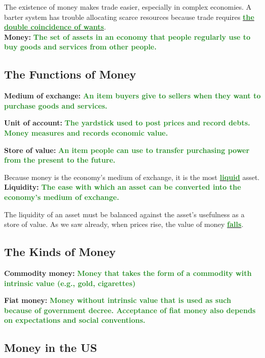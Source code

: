 \documentclass[11pt]{article}\usepackage[]{graphicx}\usepackage[]{color}
\theoremstyle{definition}
\newcommand{\ddp}[1]{{\textbf{\textcolor{ForestGreen}{#1}}}}
\newcommand{\dd}[1]{{\underline{\textbf{\textcolor{ForestGreen}{#1}}}}}
\newcommand{\defn}[1]{\textbf{#1}}
\begin{document}
The existence of money makes trade easier, especially in complex economies. A barter system has trouble allocating scarce resources because trade requires \dd{the double coincidence of wants}.
\\

\defn{Money:} \ddp{The set of assets in an economy that people regularly use to buy goods and services from other people.}

\subsection{The Functions of Money}

\defn{Medium of exchange:} \ddp{An item buyers give to sellers when they want to purchase goods and services.\\}

\defn{Unit of account:} \ddp{The yardstick used to post prices and record debts. Money measures and records economic value.\\}

\defn{Store of value:} \ddp{An item people can use to transfer purchasing power from the present to the future.\\}

Because money is the economy's medium of exchange, it is the most \dd{liquid} asset.
\\

\defn{Liquidity:} \ddp{The ease with which an asset can be converted into the economy's medium of exchange.\\}

The liquidity of an asset must be balanced against the asset's usefulness as a store of value. As we saw already, when prices rise, the value of money \dd{falls}. 

\subsection{The Kinds of Money}

\defn{Commodity money:} \ddp{Money that takes the form of a commodity with intrinsic value (e.g., gold, cigarettes)\\}

\defn{Fiat money:} \ddp{Money without intrinsic value that is used as such because of government decree. Acceptance of fiat money also depends on expectations and social conventions.}

\subsection{Money in the US}
\end{document}
